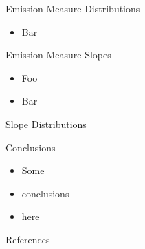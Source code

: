 \documentclass[final]{beamer}
\begin{document}
\begin{frame}
\begin{columns}[T]
\begin{column}{0.49\linewidth}
\begin{block}{Emission Measure Distributions}
\begin{itemize}
      \item Bar
      \end{itemize}
      \vspace{-2ex}
      \begin{figure}
      \end{figure}
      \vspace{-2ex}
    \end{block}
    \begin{block}{Emission Measure Slopes}
      \vspace{-1ex}
      \begin{itemize}
      \item Foo
      \item Bar
      \end{itemize}
      \vspace{-1ex}
    \end{block}
    \begin{block}{Slope Distributions}
    \end{block}
    \begin{block}{Conclusions}
      \vspace{-1ex}
      \begin{itemize}
      \item Some
      \item conclusions
      \item here
      \end{itemize}
      \vspace{-1ex}
    \end{block}
    \begin{block}{References}
      \scriptsize
      \vspace{-2ex}
      \begin{multicols}{2}
        
        
      \end{multicols}
    \end{block}
  \end{column}
  \end{columns}
\end{frame}
\end{document}
